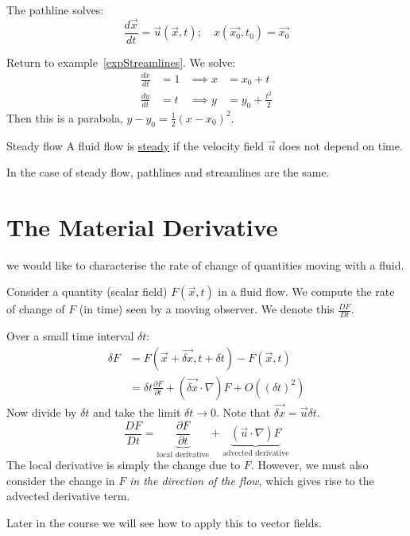 \documentclass[../Main.tex]{subfiles}
\begin{document}
The pathline solves:
\begin{equation*}
    \frac{d\vec{x}}{dt} = \vec{u}(\vec{x}, t);\quad x(\vec{x_0}, t_0) = \vec{x_0}
\end{equation*}
\begin{example}
    Return to example~\ref{expStreamlines}. We solve:
    \begin{align*}
        \frac{dx}{dt} &= 1 &\implies x &= x_0 + t \\
        \frac{dy}{dt} &= t &\implies y &= y_0 + \frac{t^2}{2}
    \end{align*}
    Then this is a parabola, $y - y_0 = \frac12 (x - x_0)^2$.
\end{example}
\begin{definition}{Steady flow}
    A fluid flow is \underline{steady} if the velocity field $\vec{u}$ does not depend on time.
\end{definition}
In the case of steady flow, pathlines and streamlines are the same.
\section{The Material Derivative}
we would like to characterise the rate of change of quantities moving with a fluid.

Consider a quantity (scalar field) $F(\vec{x}, t)$ in a fluid flow. We compute the rate of change of $F$ (in time) seen by a moving observer. We denote this $\frac{DF}{Dt}$.

Over a small time interval $\delta t$:
\begin{align*}
    \delta F &= F(\vec{x} + \vec{\delta x}, t + \delta t) - F(\vec{x}, t) \\
    &= \delta t \frac{\partial F}{\partial t} + (\vec{\delta x} \cdot \nabla) F + O((\delta t)^2)
\end{align*}
Now divide by $\delta t$ and take the limit $\delta t \to 0$. Note that $\vec{\delta x} = \vec{u} \delta t$.
\begin{equation}
    \frac{DF}{Dt} = \underbrace{\frac{\partial F}{\partial t}}_{\text{local derivative}} + \underbrace{(\vec{u} \cdot \nabla) F}_{\text{advected derivative}}
    \label{eqnMatDerivative}
\end{equation}
The local derivative is simply the change due to $F$. However, we must also consider the change in $F$ \textit{in the direction of the flow}, which gives rise to the advected derivative term.

Later in the course we will see how to apply this to vector fields.
\end{document}
